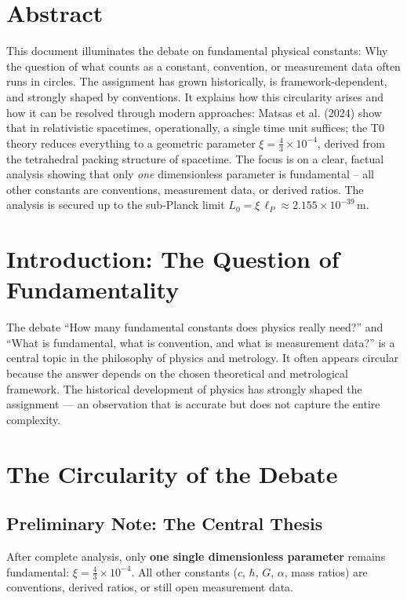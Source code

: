 \section*{Abstract}
		This document illuminates the debate on fundamental physical constants: Why the question of what counts as a constant, convention, or measurement data often runs in circles. The assignment has grown historically, is framework-dependent, and strongly shaped by conventions. It explains how this circularity arises and how it can be resolved through modern approaches: Matsas et al. (2024) show that in relativistic spacetimes, operationally, a single time unit suffices; the T0 theory reduces everything to a geometric parameter $\xi = \frac{4}{3} \times 10^{-4}$, derived from the tetrahedral packing structure of spacetime. The focus is on a clear, factual analysis showing that only \emph{one} dimensionless parameter is fundamental -- all other constants are conventions, measurement data, or derived ratios. The analysis is secured up to the sub-Planck limit $L_0 = \xi \, \ell_P \approx 2.155 \times 10^{-39}\,\text{m}$.


	
	\section{Introduction: The Question of Fundamentality}
	The debate ``How many fundamental constants does physics really need?'' and ``What is fundamental, what is convention, and what is measurement data?'' is a central topic in the philosophy of physics and metrology. It often appears circular because the answer depends on the chosen theoretical and metrological framework. The historical development of physics has strongly shaped the assignment --- an observation that is accurate but does not capture the entire complexity.
	
	\section{The Circularity of the Debate}
	
	\subsection{Preliminary Note: The Central Thesis}
	After complete analysis, only \textbf{one single dimensionless parameter} remains fundamental: $\xi = \frac{4}{3} \times 10^{-4}$. All other constants ($c$, $\hbar$, $G$, $\alpha$, mass ratios) are conventions, derived ratios, or still open measurement data.
	
